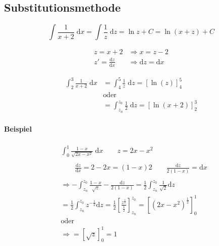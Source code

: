 \subsection{Substitutionsmethode}

\[
    \int \frac{1}{x+2} \;\mathrm{d}x = \int \frac{1}{z} \;\mathrm{d}z = \ln z + C = \ln (x+z) + C
\]

\begin{align*}
    z = x + 2 &\Rightarrow x = z - 2 \\
    z' = \frac{\mathrm{d}z}{\mathrm{d}x} &\Rightarrow \mathrm{d}z = \mathrm{d}x
\end{align*}

\begin{align*}
    \int_2^3 \frac{1}{x+2} \;\mathrm{d}x &= \int_4^5 \frac{1}{z} \;\mathrm{d}z = [\ln(z)]_4^5 \\
    &\text{oder} \\
    &= \int_{z_n}^{z_0} \frac{1}{2} \;\mathrm{d}z = [\ln(x+2)]_2^3
\end{align*}

\paragraph{Beispiel}


\begin{align*}
    &\int_0^1 \frac{1-x}{\sqrt{2x-x^2}} \;\mathrm{d}x
    \qquad z = 2x - x^2 \\
    \\
    &\qquad \frac{\mathrm{d}z}{\mathrm{d}x} = 2 - 2x = (1-x)2
    \qquad \frac{\mathrm{d}z}{2(1-x)} = \mathrm{d}x \\
    \\
    &\Rightarrow - \int_{z_n}^{z_0} \frac{1-x}{\sqrt{z}} - \frac{\mathrm{d}z}{2(1-x)}
    = \frac{1}{2} \int_{z_n}^{z_0} \frac{1}{\sqrt{2}} \mathrm{d}z \\
    &= \frac{1}{2} \int_{z_n}^{z_0} z^{-\frac{1}{2}} \mathrm{d}z 
    = \frac{1}{2} \left[ \frac{z^{\frac{1}{2}}}{\frac{1}{2}} \right]_{z_n}^{z_0}
    = \left[ \left( 2x-x^2 \right)^\frac{1}{2} \right]_0^1 \\
    &\text{oder} \\
    &\Rightarrow = \left[ \sqrt{z} \right]_0^1 = 1
\end{align*}
